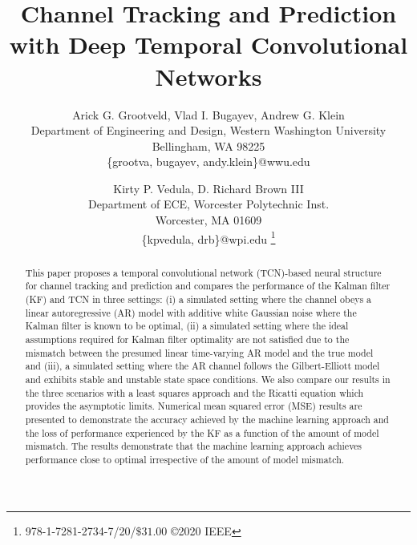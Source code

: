 \documentclass[twocolumn,letterpaper]{IEEEAerospaceCLS}  %
\begin{document}
\title{Channel Tracking and Prediction with Deep Temporal Convolutional Networks}

\author{%
Arick G. Grootveld, Vlad I. Bugayev, Andrew G. Klein\\
Department of Engineering and Design, Western Washington University\\
Bellingham, WA 98225\\
\{grootva, bugayev, andy.klein\}@wwu.edu
\and
Kirty P. Vedula, D. Richard Brown III\\
Department of ECE, Worcester Polytechnic Inst.\\
Worcester, MA 01609\\
\{kpvedula, drb\}@wpi.edu
\thanks{\footnotesize 978-1-7281-2734-7/20/$\$31.00$ \copyright2020 IEEE}              %
}


\maketitle

\thispagestyle{plain}
\pagestyle{plain}




\begin{abstract}

This paper proposes a temporal convolutional network (TCN)-based neural structure for channel tracking and prediction and compares the performance of the Kalman filter (KF) and TCN in three settings: (i) a simulated setting where the channel obeys a linear autoregressive (AR) model with additive white Gaussian noise where the Kalman filter is known to be optimal, (ii) a simulated setting where the ideal assumptions required for Kalman filter optimality are not satisfied due to the mismatch between the presumed linear time-varying AR model and the true model and (iii), a simulated setting where the AR channel follows the Gilbert-Elliott model and exhibits stable and unstable state space conditions. We also  compare  our  results in the three  scenarios  with  a  least  squares  approach  and  the Ricatti equation which provides the asymptotic limits. Numerical mean squared error (MSE) results are presented to demonstrate the accuracy achieved by the machine learning approach and the loss of performance experienced by the KF as a function of the amount of model mismatch. The results demonstrate that the machine learning approach achieves performance close to optimal irrespective of the amount of model mismatch.

\end{abstract}
\end{document}
